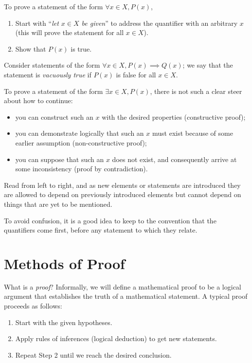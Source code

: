 To prove a statement of the form $\forall x \in X, P(x)$,
\begin{enumerate}
\item Start with ``\emph{let $x \in X$ be given}'' to address the quantifier with an arbitrary $x$ (this will prove the statement for all $x\in X$).
\item Show that $P(x)$ is true.
\end{enumerate}
Consider statements of the form $\forall x\in X, P(x)\implies Q(x)$; we say that the statement is \emph{vacuously true} if $P(x)$ is false for all $x\in X$.

To prove a statement of the form $\exists x \in X, P(x)$, there is not such a clear steer about how to continue:
\begin{itemize}
\item you can construct such an $x$ with the desired properties (constructive proof);
\item you can demonstrate logically that such an $x$ must exist because of some earlier assumption (non-constructive proof); 
\item you can suppose that such an $x$ does not exist, and consequently arrive at some inconsistency (proof by contradiction).
\end{itemize}

\begin{remark}
Read from left to right, and as new elements or statements are introduced they are allowed to depend on previously introduced elements but cannot depend on things that are yet to be mentioned.
\end{remark}

\begin{remark}
To avoid confusion, it is a good idea to keep to the convention that the quantifiers come first, before any statement to which they relate.
\end{remark}
\pagebreak

\section{Methods of Proof}
What is a \emph{proof}? Informally, we will define a mathematical proof to be a logical argument that establishes the truth of a mathematical statement. A typical proof proceeds as follows:
\begin{enumerate}
\item Start with the given hypotheses.
\item Apply rules of inferences (logical deduction) to get new statements.
\item Repeat Step 2 until we reach the desired conclusion.
\end{enumerate}

